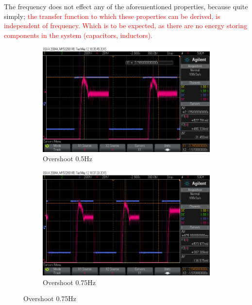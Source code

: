 \documentclass[11pt,a4paper]{article}
\begin{document}
\begin{enumerate}
	The frequency does not effect any of the aforementioned properties, because quite simply; \textcolor{red}{the transfer function to which these properties can be derived, is independent of frequency. Which is to be expected, as there are no energy storing components in the system (capacitors, inductors).} 

\begin{figure}[H]
  \begin{subfigure}{0.5\textwidth}
  \includegraphics[width=0.95\linewidth]{Ossilloscope/PartD_0_5Hz_Overshoot.png} 
  \caption{Overshoot 0.5Hz}
  \label{fig:subim1}
  \end{subfigure}	  
  \begin{subfigure}{0.5\textwidth}
  \includegraphics[width=0.95\linewidth]{Ossilloscope/PartD_0_75Hz_Overshoot.png}
  \caption{Overshoot 0.75Hz}
  \label{fig:subim2}
  \end{subfigure}
  

\end{figure}
\end{enumerate}
\end{document}

